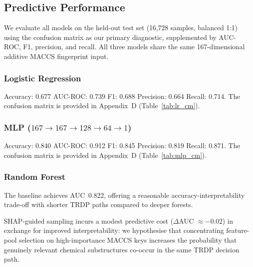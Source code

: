\documentclass[letterpaper]{article} %
\begin{document}
\subsection{Predictive Performance}
We evaluate all models on the held-out test set (16,728 samples, balanced 1:1) using the confusion matrix as our primary diagnostic, supplemented by AUC-ROC, F1, precision, and recall.  All three models share the same 167-dimensional additive MACCS fingerprint input.

\subsubsection{Logistic Regression}
Accuracy: 0.677 \quad AUC-ROC: 0.739 \quad F1: 0.688 \quad Precision: 0.664 \quad Recall: 0.714.
The confusion matrix is provided in Appendix~D (Table~\ref{tab:lr_cm}).

\subsubsection{MLP ($167{\rightarrow}167{\rightarrow}128{\rightarrow}64{\rightarrow}1$)}
Accuracy: 0.840 \quad AUC-ROC: 0.912 \quad F1: 0.845 \quad Precision: 0.819 \quad Recall: 0.871.
The confusion matrix is provided in Appendix~D (Table~\ref{tab:mlp_cm}).

\subsubsection{Random Forest}
The baseline achieves AUC~0.822, offering a reasonable accuracy-interpretability trade-off with shorter TRDP paths compared to deeper forests.

SHAP-guided sampling incurs a modest predictive cost ($\Delta$AUC $\approx -0.02$) in exchange for improved interpretability: we hypothesise that concentrating feature-pool selection on high-importance MACCS keys increases the probability that genuinely relevant chemical substructures co-occur in the same TRDP decision path. 

\begin{table}[h]
\centering
\caption{Baseline vs.\ SHAP-guided RF ($T=200$, $d_{\max}=20$) on the test set.}
\label{tab:shap_guided_d20}
\end{table}
\end{document}
